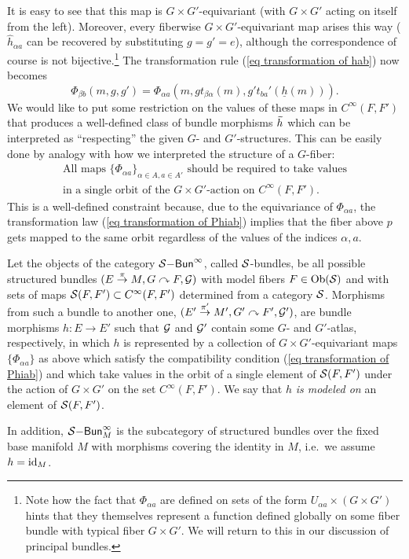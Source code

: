 It is easy to see that this map is $G\times G'$-equivariant (with $G\times G'$ acting on itself from the left). Moreover, every fiberwise $G\times G'$-equivariant map arises this way ($\hat{h}_{\alpha a}$ can be recovered by substituting $g=g'=e$), although the correspondence of course is not bijective.\footnote{Note how the fact that $\Phi_{\alpha a}$ are defined on sets of the form $U_{\alpha a}\times (G\times G')$ hints that they themselves represent a function defined globally on some fiber bundle with typical fiber $G\times G'$. We will return to this in our discussion of principal bundles.} The transformation rule (\ref{eq transformation of hab}) now becomes
\[\boxed{\Phi_{\beta b}(m,g,g')=\Phi_{\alpha a}\left(m,gt_{\beta\alpha}(m),g't_{ba}'(\underline{h}(m))\right).}\label{eq transformation of Phiab}\]
We would like to put some restriction on the values of these maps in $C^\infty(F,F')$ that produces a well-defined class of bundle morphisms $\wt h$ which can be interpreted as ``respecting'' the given $G$- and $G'$-structures. This can be easily done by analogy with how we interpreted the structure of a $G$-fiber:
\begin{gather}
    \text{All maps }\{\Phi_{\alpha a}\}_{\alpha\in A,a\in A'}\text{ should be required to take values}\\
    \text{in a single orbit of the }G\times G'\text{-action on }C^\infty(F,F').
\end{gather}
This is a well-defined constraint because, due to the equivariance of $\Phi_{\alpha a}$, the transformation law (\ref{eq transformation of Phiab}) implies that the fiber above $p$ gets mapped to the same orbit regardless of the values of the indices $\alpha,a$.

\begin{defn}\label{def S-bundle}
    Let the objects of the category $\mathcal{S}\mathsf{-Bun}^\infty$, called $\mathcal{S}$-bundles, be all possible structured bundles $(E\overset{\pi}{\to}M,G\curvearrowright F,\mathcal{G})$ with model fibers $F\in\operatorname{Ob}(\mathcal{S})$ and with sets of maps $\mathcal{S}(F,F')\subset C^\infty(F,F')$ determined from a category $\mathcal{S}$. Morphisms from such a bundle to another one, $(E'\overset{\pi'}{\to}M',G'\curvearrowright F',\mathcal{G}')$, are bundle morphisms $h:E\to E'$ such that $\mathcal{G}$ and $\mathcal{G}'$ contain some $G$- and $G'$-atlas, respectively, in which $h$ is represented by a collection of $G\times G'$-equivariant maps $\{\Phi_{\alpha a}\}$ as above which satisfy the compatibility condition (\ref{eq transformation of Phiab}) and which take values in the orbit of a single element of $\mathcal{S}(F,F')$ under the action of $G\times G'$ on the set $C^\infty(F,F')$. We say that $h$ \emph{is modeled on} an element of $\mathcal{S}(F,F')$.

    In addition, ${\mathcal{S}\mathsf{-Bun}}_M^\infty$ is the subcategory of structured bundles over the fixed base manifold $M$ with morphisms covering the identity in $M$, i.e.\ we assume $h=\operatorname{id}_M$.
\end{defn}

